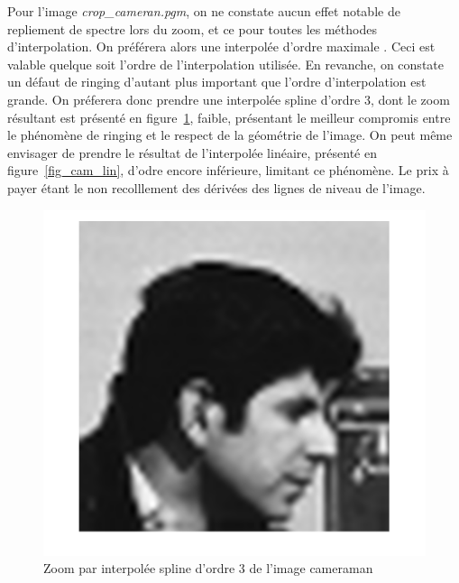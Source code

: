\documentclass[12pt,a4paper,onecolumn]{article}
\begin{document}
Pour l'image \textit{crop\_cameran.pgm}, on ne constate aucun effet notable de repliement de spectre lors du zoom, et ce pour toutes les méthodes d'interpolation. On préférera alors une interpolée d'ordre maximale . Ceci est valable quelque soit l'ordre de l'interpolation utilisée. En revanche, on constate un défaut de ringing d'autant plus important que l'ordre d'interpolation est grande. On préferera donc prendre une interpolée spline d'ordre 3, dont le zoom résultant est présenté en figure~\ref{fig_cam_3}, faible, présentant le meilleur compromis entre le phénomène de ringing et le respect de la géométrie de l'image. On peut même envisager de prendre le résultat de l'interpolée linéaire, présenté en figure~\ref{fig_cam_lin}, d'odre encore inférieure, limitant ce phénomène. Le prix à payer étant le non recolllement des dérivées des lignes de niveau de l'image.

\begin{figure}[H]
	\centering
	\includegraphics[height = 0.4\textheight]{cam_3}
	\caption{Zoom par interpolée spline d'ordre 3 de l'image cameraman}
	\label{fig_cam_3}
\end{figure}
\end{document}
